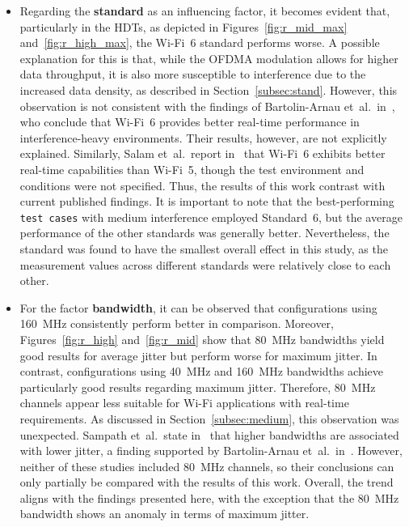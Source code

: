 \begin{itemize}
\item Regarding the \textbf{standard} as an influencing factor, it becomes evident that, particularly in the \acp{HDT}, as depicted in Figures~\ref{fig:r_mid_max} and~\ref{fig:r_high_max}, the Wi-Fi~6 standard performs worse.  
A possible explanation for this is that, while the \ac{OFDMA} modulation allows for higher data throughput, it is also more susceptible to interference due to the increased data density, as described in Section~\ref{subsec:stand}.  
However, this observation is not consistent with the findings of Bartolin-Arnau et~al.\ in~\cite[p.~15]{telecom6020040}, who conclude that Wi-Fi~6 provides better real-time performance in interference-heavy environments.  
Their results, however, are not explicitly explained.  
Similarly, Salam et~al.\ report in~\cite[p.~3]{10815245} that Wi-Fi~6 exhibits better real-time capabilities than Wi-Fi~5, though the test environment and conditions were not specified.  
Thus, the results of this work contrast with current published findings.
It is important to note that the best-performing \texttt{test cases} with medium interference employed Standard~6, but the average performance of the other standards was generally better.  
Nevertheless, the standard was found to have the smallest overall effect in this study, as the measurement values across different standards were relatively close to each other.  

\item For the factor \textbf{bandwidth}, it can be observed that configurations using 160~MHz consistently perform better in comparison.  
Moreover, Figures~\ref{fig:r_high} and~\ref{fig:r_mid} show that 80~MHz bandwidths yield good results for average jitter but perform worse for maximum jitter.  
In contrast, configurations using 40~MHz and 160~MHz bandwidths achieve particularly good results regarding maximum jitter.  
Therefore, 80~MHz channels appear less suitable for Wi-Fi applications with real-time requirements.  
As discussed in Section~\ref{subsec:medium}, this observation was unexpected.  
Sampath et~al.\ state in~\cite[p.~279]{network3020014} that higher bandwidths are associated with lower jitter, a finding supported by Bartolin-Arnau et~al.\ in~\cite[p.~15]{telecom6020040}.  
However, neither of these studies included 80~MHz channels, so their conclusions can only partially be compared with the results of this work.  
Overall, the trend aligns with the findings presented here, with the exception that the 80~MHz bandwidth shows an anomaly in terms of maximum jitter.  
\end{itemize}  


